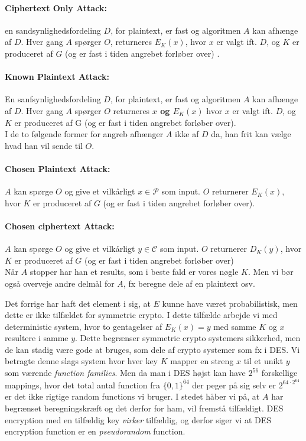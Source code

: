 \documentclass[paper=a4, fontsize=11pt]{scrartcl} %
\numberwithin{equation}{section} %
\numberwithin{figure}{section} %
\numberwithin{table}{section} %
\begin{document}
	\paragraph{\textbf{Ciphertext Only Attack:}} en sandsynlighedsfordeling $D$, for plaintext, er fast og algoritmen $A$ kan afhænge af $D$. Hver gang $A$ spørger $O$, returneres $E_K(x)$, hvor $x$ er valgt ift. $D$, og $K$ er produceret af $G$ (og er fast i tiden angrebet forløber over) .
	\paragraph{\textbf{Known Plaintext Attack:}} En sanfsynlighedsfordeling $D$, for plaintext, er fast og algoritmen $A$ kan afhænge af $D$. Hver gang $A$ spørger $O$ returneres \textbf{$x$ og $E_K(x)$} hvor $x$ er valgt ift. $D$, og $K$ er produceret af G (og er fast i tiden angrebet forløber over). \\
	
	I de to følgende former for angreb afhænger $A$ ikke af $D$ da, han frit kan vælge hvad han vil sende til $O$.
	
	\paragraph{\textbf{Chosen Plaintext Attack:}} $A$ kan spørge $O$ og give et vilkårligt $x\in\mathcal{P}$ som input. $O$ returnerer $E_K(x)$, hvor $K$ er produceret af $G$ (og er fast i tiden angrebet forløber over).
	\paragraph{\textbf{Chosen ciphertext Attack:}} $A$ kan spørge $O$ og give et vilkårligt $y\in\mathcal{C}$ som input. $O$ returnerer $D_K(y)$, hvor $K$ er produceret af $G$ (og er fast i tiden angrebet forløber over) \\
	
	Når $A$ stopper har han et results, som i beste fald er vores nøgle $K$. Men vi bør også overveje andre delmål for $A$, fx beregne dele af en plaintext osv.
	
	Det forrige har haft det element i sig, at $E$ kunne have været probabilistisk, men dette er ikke tilfældet for symmetric crypto. I dette tilfælde arbejde vi med deterministic system, hvor to gentagelser af $E_K(x)=y$ med samme $K$ og $x$ resultere i samme $y$. Dette begrænser symmetric crypto systemers sikkerhed, men de kan stadig være gode at bruges, som dele af crypto systemer som fx i DES. Vi betragte denne slags system hvor hver key $K$ mapper en streng $x$ til et unikt $y$ som værende \textit{function families}. Men da man i DES højst kan have $2^{56}$ forskellige mappings, hvor det total antal function fra $\{0,1\}^{64}$ der peger på sig selv er $2^{64\cdot 2^{64}}$ er det ikke rigtige random functions vi bruger. I stedet håber vi på, at $A$ har begrænset beregningskræft og det derfor for ham, vil fremstå tilfældigt. DES encryption med en tilfældig key \textit{virker} tilfældig, og derfor siger vi at DES encryption function er en \textit{pseudorandom} function.\\
	
\end{document}
